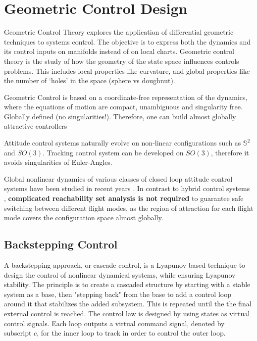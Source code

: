 \chapter{Geometric Control Design} \label{ch:control}

\cite{Bullo2005,Jurdjevic1997}

Geometric Control Theory explores the application of differential geometric techniques to systems control. The objective is to express both the dynamics and its control inputs on manifolds instead of on local charts.
Geometric control theory is the study of how the geometry of the state space influences controls problems. This includes local properties like curvature, and global properties like the number of `holes’ in the space (sphere vs doughnut).


Geometric Control is based on a coordinate-free representation of the dynamics, where the equations of motion are compact, unambiguous and singularity free. 
Globally defined (no singularities!). Therefore, one can build almost globally attractive controllers

Attitude control systems naturally evolve on non-linear configurations such as $ \mathbb{S}^2 $ and $ SO(3) $. 
Tracking control system can be developed on $ SO(3) $, therefore it avoids singularities of Euler-Angles.

Global nonlinear dynamics of various classes of closed loop attitude control systems have been studied in recent years \cite{Chaturvedi2011a}.
In contrast to hybrid control systems \cite{Gillula2010}, \textbf{complicated reachability set analysis is not required} to guarantee safe switching between different flight modes, as the region of attraction for each flight mode covers the configuration space almost globally.

\section{Backstepping Control}
A backstepping approach, or cascade control, is a Lyapunov based technique to design the control of nonlinear dynamical systems, while ensuring Lyapunov stability. The principle is to create a cascaded structure by starting with a stable system as a base, then "stepping back" from the base to add a control loop around it that stabilizes the added subsystem. This is repeated until the the final external control is reached.
The control law is designed by using states as virtual control signals. Each loop outputs a virtual command signal, denoted by subscript $ c $, for the inner loop to track in order to control the outer loop.


